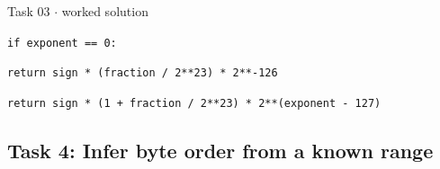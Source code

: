 \documentclass[11pt]{article}
\begin{document}
\begin{keepsection}
\begin{workedbox}{Task 03 \ensuremath{\cdot} worked solution}
\begin{enumerate}
\begin{tcolorbox}[colback=Paperblue,colframe=Paperblue,boxrule=0pt,arc=0pt,left=7pt,right=7pt,top=5pt,bottom=5pt]
\noindent\hspace*{1em}\texttt{if exponent == 0:}\par
\noindent\hspace*{3em}\texttt{return sign * (fraction / 2**23) * 2**-126}\par
\noindent\hspace*{1em}\texttt{return sign * (1 + fraction / 2**23) * 2**(exponent - 127)}\par
\end{tcolorbox}
\end{enumerate}
\end{workedbox}

\end{keepsection}
\begin{keepsection}\subsection{Task 4: Infer byte order from a known range}


\end{keepsection}
\end{document}
